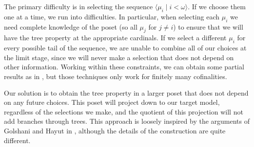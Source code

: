 \documentclass[psamsfonts]{amsart}
\theoremstyle{definition}
\newcommand{\w}{\omega}
\numberwithin{equation}{section}
\begin{document}
The primary difficulty is in selecting the sequence $\langle \mu_i \mid i<\w\rangle$. If we choose them one at a time, we run into difficulties. In particular, when selecting each $\mu_i$ we need complete knowledge of the poset (so all $\mu_j$ for $j\neq i$) to ensure that we will have the tree property at the appropriate cardinals. If we select a different $\mu_i$ for every possible tail of the sequence, we are unable to combine all of our choices at the limit stage, since we will never make a selection that does not depend on other information. %
Working within these constraints, we can obtain some partial results as in \cite{adkisson:ITP}, but those techniques only work for finitely many cofinalities.

Our solution is to obtain the tree property in a larger poset that does not depend on any future choices. This poset will project down to our target model, regardless of the selections we make, and the quotient of this projection will not add branches through trees. This approach is loosely inspired by the arguments of Golshani and Hayut in \cite{golshani-hayut:tpcountablesegment}, although the details of the construction are quite different.
\end{document}
